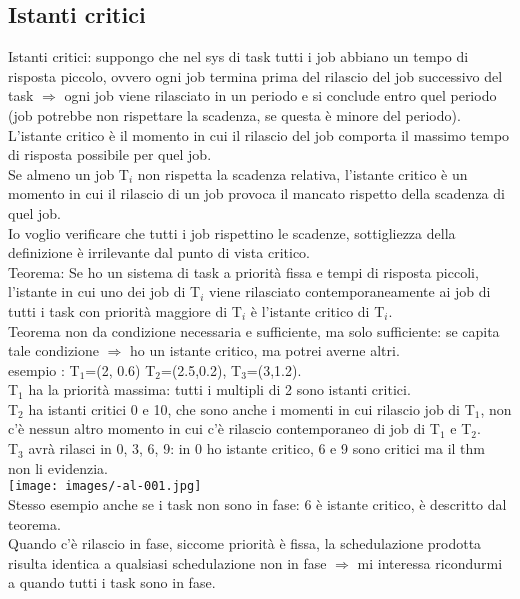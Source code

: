 \documentclass{article}
\begin{document}
\subsection{Istanti critici}
Istanti critici: suppongo che nel sys di task tutti i job abbiano un tempo di risposta piccolo, ovvero ogni job termina prima del rilascio del job successivo del task $\Rightarrow$ ogni job viene rilasciato in un periodo e si conclude entro quel periodo (job potrebbe non rispettare la scadenza, se questa è minore del periodo).\\ L'istante critico è il momento in cui il rilascio del job comporta il massimo tempo di risposta possibile  per quel job.\\ Se almeno un job T$_{i}$ non rispetta la scadenza relativa, l'istante critico è un momento in cui il rilascio di un job provoca il mancato rispetto della scadenza di quel job.\\ Io voglio verificare che tutti i job rispettino le scadenze, sottigliezza della definizione è irrilevante dal punto di vista critico.\\ Teorema: Se ho un sistema di task a priorità fissa e tempi di risposta piccoli, l'istante in cui uno dei job di T$_{i}$  viene rilasciato contemporaneamente ai job di tutti i task con priorità maggiore di T$_{i}$ è l'istante critico di T$_{i}$.\\ Teorema non da condizione necessaria e sufficiente, ma solo sufficiente: se capita tale condizione $\Rightarrow$ ho un istante critico, ma potrei averne altri.\\ esempio : T$_{1}$=(2, 0.6) T$_{2}$=(2.5,0.2), T$_{3}$=(3,1.2).\\ T$_{1}$ ha la priorità massima: tutti i multipli di 2 sono istanti critici.\\ T$_{2}$ ha istanti critici 0 e 10, che sono anche i momenti in cui rilascio job di T$_{1}$, non c'è nessun altro momento in cui c'è rilascio contemporaneo di job di T$_{1}$ e T$_{2}$.\\ T$_{3}$ avrà rilasci in 0, 3, 6, 9: in 0 ho istante critico, 6 e 9 sono critici ma il thm non li evidenzia.\\
\texttt{[image: images/-al-001.jpg]}\\
Stesso esempio anche se i task non sono in fase: 6 è istante critico, è descritto dal teorema.\\ Quando c'è rilascio in fase, siccome priorità è fissa, la schedulazione prodotta risulta identica a qualsiasi schedulazione non in fase $\Rightarrow$ mi interessa ricondurmi a quando tutti i task sono in fase.
\end{document}

